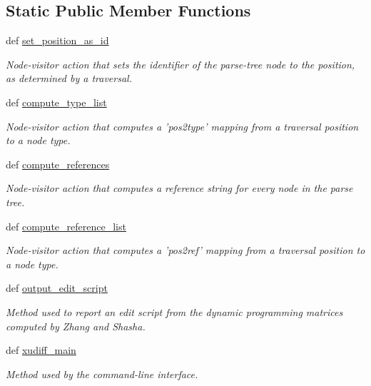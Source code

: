\subsection*{Static Public Member Functions}
\begin{DoxyCompactItemize}
\item 
def \hyperlink{classxutools_1_1tools_1_1_x_u_diff_ad1ac79030ee11d7733cf5dc1c5ab6162}{set\-\_\-position\-\_\-as\-\_\-id}
\begin{DoxyCompactList}\small\item\em Node-\/visitor action that sets the identifier of the parse-\/tree node to the position, as determined by a traversal. \end{DoxyCompactList}\item 
def \hyperlink{classxutools_1_1tools_1_1_x_u_diff_a8d405b9d898a7bebc0711943cb765b0a}{compute\-\_\-type\-\_\-list}
\begin{DoxyCompactList}\small\item\em Node-\/visitor action that computes a 'pos2type' mapping from a traversal position to a node type. \end{DoxyCompactList}\item 
def \hyperlink{classxutools_1_1tools_1_1_x_u_diff_af0b107fc31d8a9586129f0a3c0b733ab}{compute\-\_\-references}
\begin{DoxyCompactList}\small\item\em Node-\/visitor action that computes a reference string for every node in the parse tree. \end{DoxyCompactList}\item 
def \hyperlink{classxutools_1_1tools_1_1_x_u_diff_a393f4260ff446a711ee29f47fc1544d8}{compute\-\_\-reference\-\_\-list}
\begin{DoxyCompactList}\small\item\em Node-\/visitor action that computes a 'pos2ref' mapping from a traversal position to a node type. \end{DoxyCompactList}\item 
def \hyperlink{classxutools_1_1tools_1_1_x_u_diff_a2bafde0d31570449f1be4edd63eb6372}{output\-\_\-edit\-\_\-script}
\begin{DoxyCompactList}\small\item\em Method used to report an edit script from the dynamic programming matrices computed by Zhang and Shasha. \end{DoxyCompactList}\item 
def \hyperlink{classxutools_1_1tools_1_1_x_u_diff_a52ed76c34d2213135ed1395ef2cab753}{xudiff\-\_\-main}
\begin{DoxyCompactList}\small\item\em Method used by the command-\/line interface. \end{DoxyCompactList}\end{DoxyCompactItemize}


